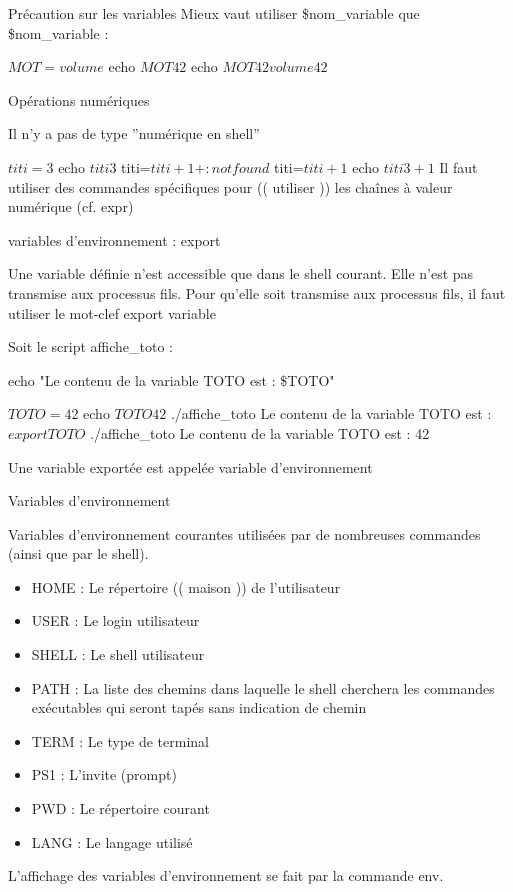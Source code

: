 \documentclass[10pt]{beamer}
\begin{document}
\begin{frame}[fragile]{Précaution sur les variables}
Mieux vaut utiliser \${nom\_variable} que \$nom\_variable :

\begin{mylisting}
$ MOT=volume
$ echo $MOT42

$ echo ${MOT}42
volume42
$
\end{mylisting}
\end{frame}

\begin{frame}[fragile]{Opérations numériques}

Il n’y a pas de type ”numérique en shell”

$ titi=3
$ echo $titi
3
$ titi=$titi + 1
+ : not found
$ titi=$titi+1
$ echo $titi
3+1
$
Il faut utiliser des commandes spécifiques pour (( utiliser )) les chaînes à valeur numérique (cf. \alert{expr})

\end{frame}

\begin{frame}[fragile]{variables d'environnement : export}

Une variable définie n’est accessible que dans le shell courant. Elle n’est pas transmise aux processus fils. Pour qu’elle soit transmise aux processus fils, il faut utiliser le mot-clef export variable

Soit le script affiche\_toto :

echo "Le contenu de la variable TOTO est : \$TOTO"

\begin{mylisting}
$ TOTO=42
$ echo $TOTO
42
$ ./affiche_toto
Le contenu de la variable TOTO est :
$ export TOTO
$ ./affiche_toto
Le contenu de la variable TOTO est : 42
$
$
\end{mylisting}

Une variable exportée est appelée \alert{variable d’environnement}

\end{frame}

\begin{frame}{Variables d'environnement}

Variables d’environnement courantes utilisées par de nombreuses commandes (ainsi que par le shell).
\begin{itemize}
\item \alert{HOME} : Le répertoire (( maison )) de l’utilisateur 
\item \alert{USER} : Le login utilisateur
\item \alert{SHELL} : Le shell utilisateur
\item \alert{PATH} : La liste des chemins dans laquelle le shell cherchera les commandes exécutables qui seront tapés sans indication de chemin
\item \alert{TERM} : Le type de terminal
\item \alert{PS1} : L’invite (prompt)
\item \alert{PWD} : Le répertoire courant
\item \alert{LANG} : Le langage utilisé
\end{itemize}
L’affichage des variables d’environnement se fait par la commande \alert{env}.
\end{frame}
\end{document}
